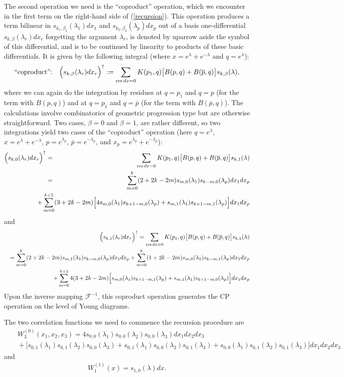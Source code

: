 \documentclass[11pt]{article}
\def\be{\begin{equation}}
\def\ee{\end{equation}}
\def\bea{\begin{eqnarray}}
\def\eea{\end{eqnarray}}
\def\bea{\begin{eqnarray}}
\def\eea{\end{eqnarray}}
\theoremstyle{plain}
\theoremstyle{definition}
\def\bea{\begin{eqnarray}}
\def\eea{\end{eqnarray}}
\begin{document}
The second operation we need is the ``coproduct'' operation, which we encounter in the first term on the right-hand side of (\ref{recursion}). This operation
produces a term bilinear in $s_{k_1,\beta_1}(\lambda_1)dx_1$ and $s_{k_2,\beta_2}(\lambda_p)dx_p$ out of a basis one-differential
 $s_{k,\beta}(\lambda_r)dx_r$ forgetting the argument $\lambda_r$, is denoted by uparrow aside the symbol of this differential, and
 is to be continued by linearity to products of these basic differentials. It is given by the following integral (where $x=e^\lambda+e^{-\lambda}$ and $q=e^\lambda$):
\be
\hbox{``coproduct'':}\quad  \Bigl(s_{k,\beta}(\lambda_r)dx_r\Bigr)^{\uparrow}:=\sum_{\mathrm{res\,}dx=0} K(p_1,q)\bigl[ B(p,q)+B(\overline p,q)\bigr]
s_{k,\beta}(\lambda),
\label{breed1}
\ee
where we can again do the integration by residues at $q=p_1$ and $q=p$ (for the term with $B(p,q)$) 
and at $q=p_1$ and $q=\overline p$ (for the term with $B(\overline p,q)$). The calculations involve combinatorics of geometric progression type but 
are otherwise straightforward. Two cases, $\beta=0$ and $\beta=1$, are rather different, so two integrations yield two
cases of the ``coproduct'' operation (here $q=e^\lambda$, $x=e^{\lambda}+e^{-\lambda}$, 
$p=e^{\lambda_p}$, $\overline p=e^{-\lambda_p}$, and $x_p=e^{\lambda_p}+e^{-\lambda_p}$):
\bea
 \Bigl(s_{k,0}(\lambda_r)dx_r\Bigr)^{\uparrow}&=&\sum_{\mathrm{res\,}dx=0} K(p_1,q)\bigl[ B(p,q)+B(\overline p,q)\bigr]
s_{k,1}(\lambda)\nonumber\\
&=&\sum_{m=0}^k (2+2k-2m)s_{m,0}(\lambda_1)s_{k-m,0}(\lambda_p)dx_1 dx_p\nonumber\\
&{}&\hskip-1.2cm+\sum_{m=0}^{k+1} (3+2k-2m)\Bigl[4s_{m,0}(\lambda_1)s_{k+1-m,0}(\lambda_p)
+s_{m,1}(\lambda_1)s_{k+1-m,1}(\lambda_p)\Bigr]dx_1 dx_p
\label{breed2}
\eea
and
\bea
&{}& \Bigl(s_{k,1}(\lambda_r)dx_r\Bigr)^{\uparrow}=\sum_{\mathrm{res\,}dx=0} K(p_1,q)\bigl[ B(p,q)+B(\overline p,q)\bigr]
s_{k,1}(\lambda)\nonumber\\
&{}&=\sum_{m=0}^k (2+2k-2m)s_{m,1}(\lambda_1)s_{k-m,0}(\lambda_p)dx_1 dx_p
+\sum_{m=0}^k (1+2k-2m)s_{m,0}(\lambda_1)s_{k-m,1}(\lambda_p)dx_1 dx_p
\nonumber\\
&{}&\qquad +\sum_{m=0}^{k+1} 4(3+2k-2m) \Bigl[s_{m,0}(\lambda_1)s_{k+1-m,1}(\lambda_p)
+s_{m,1}(\lambda_1)s_{k+1-m,0}(\lambda_p)\Bigr]dx_1 dx_p
\label{breed3}
\eea
Upon the inverse mapping ${\mathcal F}^{-1}$, this coproduct operation generates the CP operation on the level of Young diagrams.

The two correlation functions we need to commence the recursion procedure are
\bea
&{}&W_3^{(0)}(x_1,x_2,x_3)=4s_{0,0}(\lambda_1)s_{0,0}(\lambda_2)s_{0,0}(\lambda_3)dx_1dx_2dx_3\nonumber\\
&{}&\!\!\!\!\!\!\!\!+\bigl[s_{0,1}(\lambda_1)s_{0,1}(\lambda_2)s_{0,0}(\lambda_3)+
s_{0,1}(\lambda_1)s_{0,0}(\lambda_2)s_{0,1}(\lambda_3)+
s_{0,0}(\lambda_1)s_{0,1}(\lambda_2)s_{0,1}(\lambda_3)\bigr]dx_1dx_2dx_3
\label{W30-GUE}
\eea
and
\bea
W^{(1)}_1(x)=s_{1,0}(\lambda)dx.
\label{W11-GUE}
\eea
\end{document}

